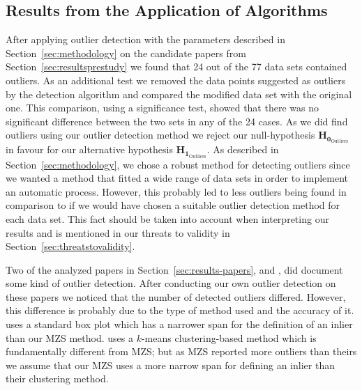 \subsection{Results from the Application of Algorithms}
\label{sec:discussion-resultsapplication}
After applying outlier detection with the parameters described in Section~\ref{sec:methodology} on the candidate papers from Section~\ref{sec:resultsprestudy} we found that 24 out of the 77 data sets contained outliers. As an additional test we removed the data points suggested as outliers by the detection algorithm and compared the modified data set with the original one. This comparison, using a significance test, showed that there was no significant difference between the two sets in any of the 24 cases. As we did find outliers using our outlier detection method we reject our null-hypothesis $\mathbf{H_{0_{\mathrm{Outliers}}}}$ in favour for our alternative hypothesis $\mathbf{H_{1_{\mathrm{Outliers}}}}$. As described in Section~\ref{sec:methodology}, we chose a robust method for detecting outliers since we wanted a method that fitted a wide range of data sets in order to implement an automatic process. However, this probably led to less outliers being found in comparison to if we would have chosen a suitable outlier detection method for each data set. This fact should be taken into account when interpreting our results and is mentioned in our threats to validity in Section~\ref{sec:threatstovalidity}.




Two of the analyzed papers in Section~\ref{sec:results-papers}, \citep{itkonen2013test} and \citep{minku2013analysis}, did document some kind of outlier detection. After conducting our own outlier detection on these papers we noticed that the number of detected outliers differed. However, this difference is probably due to the type of method used and the accuracy of it. \citet{itkonen2013test} uses a standard box plot which has a narrower span for the definition of an inlier than our MZS method. \citet{minku2013analysis} uses a $k$-means clustering-based method which is fundamentally different from MZS; but as MZS reported more outliers than theirs we assume that our MZS uses a more narrow span for defining an inlier than their clustering method.




